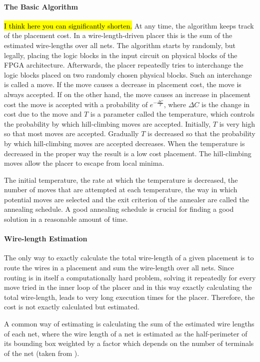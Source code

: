 \documentclass[a4paper,oneside,12pt]{article}
\begin{document}
\paragraph{The Basic Algorithm}\hl{I think here you can significantly shorten.}
At any time, the algorithm keeps track of the placement cost. In a wire-length-driven placer this is the sum of the estimated wire-lengths over all nets. The algorithm starts by randomly, but legally, placing the logic blocks in the input circuit on physical blocks of the FPGA architecture. Afterwards, the placer repeatedly tries to interchange the logic blocks placed on two randomly chosen physical blocks. Such an interchange is called a move. If the move causes a decrease in placement cost, the move is always accepted. If on the other hand, the move causes an increase in placement cost the move is accepted with a probability of $e^{-\frac{\Delta C}{T}}$, where $\Delta C$ is the change in cost due to the move and $T$ is a parameter called the temperature, which controls the probability by which hill-climbing moves are accepted. Initially, $T$ is very high so that most moves are accepted. Gradually $T$ is decreased so that the probability by which hill-climbing moves are accepted decreases. When the temperature is decreased in the proper way the result is a low cost placement. The hill-climbing moves allow the placer to escape from local minima.

The initial temperature, the rate at which the temperature is decreased, the number of moves that are attempted at each temperature, the way in which potential moves are selected and the exit criterion of the annealer are called the annealing schedule. A good annealing schedule is crucial for finding a good solution in a reasonable amount of time.

\paragraph{Wire-length Estimation}
\label{sec:wireLengthEstimation} The only way to exactly calculate the total wire-length of a given placement is to route the wires in a placement and sum the wire-length over all nets. Since routing is in itself a computationally hard problem, solving it repeatedly for every move tried in the inner loop of the placer and in this way exactly calculating the total wire-length, leads to very long execution times for the placer. Therefore, the cost is not exactly calculated but estimated.

A common way of estimating is calculating the sum of the estimated wire lengths of each net, where the wire length of a net is estimated as the half-perimeter of its bounding box weighted by a factor which depends on the number of terminals of the net (taken from \cite{cheng1994raaeprm}). %
\end{document}
